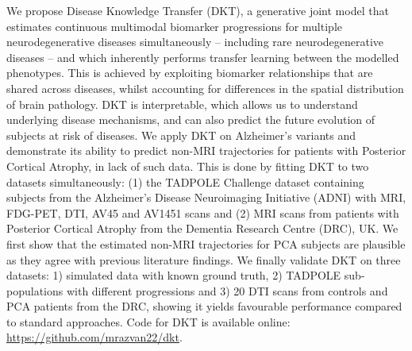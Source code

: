 We propose Disease Knowledge Transfer (DKT), a generative joint model that estimates continuous multimodal biomarker progressions for multiple neurodegenerative diseases simultaneously -- including rare neurodegenerative diseases -- and which inherently performs transfer learning between the modelled phenotypes. This is achieved by exploiting biomarker relationships that are shared across diseases, whilst accounting for differences in the spatial distribution of brain pathology. DKT is interpretable, which allows us to understand underlying disease mechanisms, and can also predict the future evolution of subjects at risk of diseases. We apply DKT on Alzheimer's variants and demonstrate its ability to predict non-MRI trajectories for patients with Posterior Cortical Atrophy, in lack of such data. This is done by fitting DKT to two datasets simultaneously: (1) the TADPOLE Challenge \cite{marinescu2018tadpole} dataset containing subjects from the Alzheimer's Disease Neuroimaging Initiative (ADNI) with MRI, FDG-PET, DTI, AV45 and AV1451 scans and (2) MRI scans from patients with Posterior Cortical Atrophy from the Dementia Research Centre (DRC), UK. We first show that the estimated non-MRI trajectories for PCA subjects are plausible as they agree with previous literature findings. We finally validate DKT on three datasets: 1) simulated data with known ground truth, 2) TADPOLE sub-populations with different progressions and 3) 20 DTI scans from controls and PCA patients from the DRC, showing it yields favourable performance compared to standard approaches. Code for DKT is available online: \url{https://github.com/mrazvan22/dkt}.


